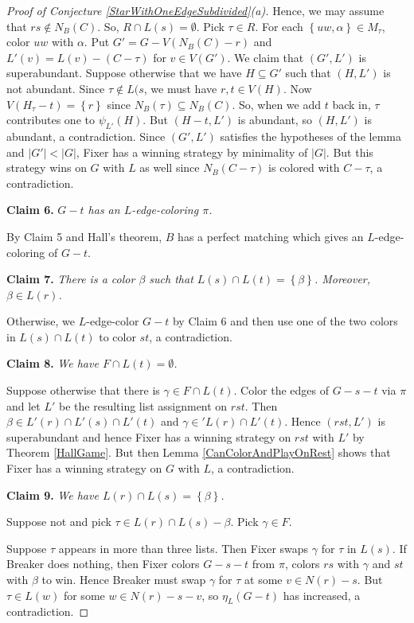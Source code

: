 \documentclass[12pt]{article}
\theoremstyle{plain}
\theoremstyle{definition}
\theoremstyle{remark}
\newcommand{\set}[1]{\left\{ #1 \right\}}
\newcommand{\card}[1]{\left|#1\right|}
\begin{document}
\begin{proof} [Proof of Conjecture \ref{StarWithOneEdgeSubdivided}(a)]
	Hence, we may assume that $rs \not \in N_B(C)$. So, $R \cap L(s) = \emptyset$. Pick $\tau \in R$. For each $\set{uw, \alpha} \in M_\tau$, color $uw$ with $\alpha$.  Put $G' = G - V(N_B(C) - r)$ and $L'(v) = L(v) - (C - \tau)$ for $v \in V(G')$.  We claim that $(G', L')$ is superabundant.  Suppose otherwise that we have $H \subseteq G'$ such that $(H, L')$ is not abundant. Since $\tau \not \in L(s$, we must have $r, t \in V(H)$.  Now $V(H_\tau - t) = \set{r}$ since $N_B(\tau) \subseteq N_B(C)$.  So, when we add $t$ back in, $\tau$ contributes one to $\psi_{L'}(H)$.  But $(H - t, L')$ is abundant, so $(H, L')$ is abundant, a contradiction.  Since $(G', L')$ satisfies the hypotheses of the lemma and $\card{G'} < \card{G}$, Fixer has a winning strategy by minimality of $\card{G}$. But this strategy wins on $G$ with $L$ as well since $N_B(C - \tau)$ is colored with $C - \tau$, a contradiction. 
	
	\noindent\textbf{Claim 6.  }\textit{$G-t$ has an $L$-edge-coloring $\pi$.}
	
	By Claim 5 and Hall's theorem, $B$ has a perfect matching which gives an $L$-edge-coloring of $G-t$.
	
	\noindent\textbf{Claim 7.  }\textit{There is a color $\beta$ such that $L(s) \cap L(t) = \set{\beta}$.  Moreover, $\beta \in L(r)$.}
	
	Otherwise, we $L$-edge-color $G-t$ by Claim 6 and then use one of the two colors in $L(s) \cap L(t)$ to color $st$, a contradiction.
	
	\noindent\textbf{Claim 8.  }\textit{We have $F \cap L(t) = \emptyset$.}
	
	Suppose otherwise that there is $\gamma \in F \cap L(t)$.  Color the edges of $G - s - t$ via $\pi$ and let $L'$ be the resulting list assignment on $rst$.  Then $\beta \in L'(r) \cap L'(s) \cap L'(t)$ and $\gamma \in 'L(r) \cap L'(t)$.  Hence $(rst, L')$ is superabundant and hence Fixer has a winning strategy on $rst$ with $L'$ by Theorem \ref{HallGame}.  But then Lemma \ref{CanColorAndPlayOnRest} shows that Fixer has a winning strategy on $G$ with $L$, a contradiction.
	
	\noindent\textbf{Claim 9.  }\textit{We have $L(r) \cap L(s) = \set{\beta}$.}
	
	Suppose not and pick $\tau \in L(r) \cap L(s) - \beta$. Pick $\gamma \in F$. 
	
	Suppose $\tau$ appears in more than three lists.  Then Fixer swaps $\gamma$ for $\tau$ in $L(s)$.  If Breaker does nothing, then Fixer colors $G - s - t$ from $\pi$, colors $rs$ with $\gamma$ and $st$ with $\beta$ to win.  Hence Breaker must swap $\gamma$ for $\tau$ at some $v \in N(r) - s$.  But $\tau \in L(w)$ for some $w \in N(r) - s - v$, so $\eta_L(G-t)$ has increased, a contradiction. 
	

\end{proof}
\end{document}
